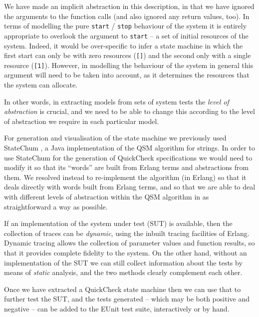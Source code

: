 \documentclass[]{sigplanconf}
\begin{document}
We have made an implicit abstraction in this description, in that we have ignored the arguments to the function calls (and also ignored any return values, too). In terms of modelling the pure \texttt{start} / \texttt{stop} behaviour of the system it is entirely appropriate to overlook the argument to \texttt{start} -- a set of initial resources of the system. Indeed, it would be over-specific to infer a state machine in which the first  start can only be with zero resources (\verb+[]+) and the second only with a single resource (\verb+[1]+). However, in modelling the behaviour of the system in general this argument will need to be taken into account, as it determines the resources that the system can allocate.

In other words, in extracting models from sets of system tests the \emph{level of abstraction} is crucial, and we need to be able to change this according to the level of abstraction we require in each particular model.
 
For generation and visualisation of the state machine we previously used StateChum \cite{arts2010test,statechum}, a Java implementation of the QSM algorithm for strings. In order to use StateChum for the generation of QuickCheck specifications we would need to modify it so that its ``words'' are built from Erlang terms and abstractions from them. We resolved instead to re-implement the algorithm (in Erlang) so that it deals directly with words built from Erlang terms, and so that we are able to deal with different levels of abstraction within the QSM algorithm in as straightforward a way as possible.

If an implementation of the system under test (SUT) is available, then the collection of traces can be \emph{dynamic}, using the inbuilt tracing facilities of Erlang. Dynamic tracing allows the collection of parameter values and function results, so that it provides complete fidelity to the system. On the other hand, without an implementation of the SUT we can still collect information about the tests by means of \emph{static} analysis, and the two methods clearly complement each other.

Once we have extracted a QuickCheck state machine then we can use that to further test the SUT, and the tests generated -- which may be both positive and negative -- can be added to the EUnit test suite, interactively or by hand.
\end{document}
